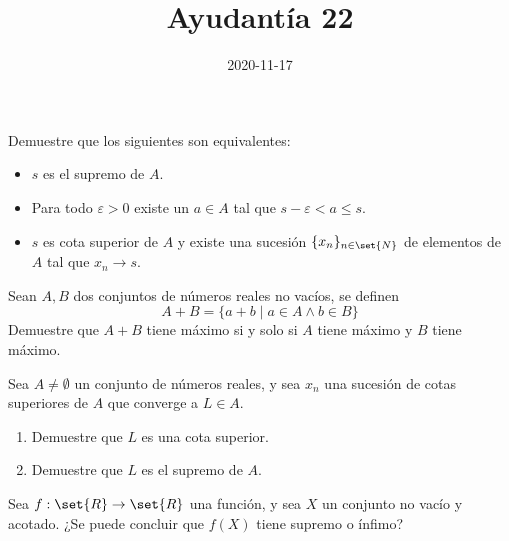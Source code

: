 \documentclass{ayudantia}
\title{Ayudantía 22}
\date{2020-11-17}
\begin{document}
\maketitle

\begin{prob}
    Demuestre que los siguientes son equivalentes:
    \begin{itemize}
        \item \(s\) es el supremo de \(A\).
        \item Para todo \(\varepsilon>0\) existe un \(a\in A\) tal que \(s-\varepsilon< a\leq s\).
        \item \(s\) es cota superior de \(A\) y existe una sucesión \(\{x_n\}_{n\in\set{N}}\) de elementos de \(A\) tal que \(x_n\rightarrow s\).
    \end{itemize}
\end{prob}

\begin{ans}
    \begin{sol}

    \end{sol}
\end{ans}



\begin{prob}
    Sean \(A,B\) dos conjuntos de números reales no vacíos, se definen
    \begin{equation*}
        A+B=\{a+b\mid a\in A\wedge b\in B\}
    \end{equation*}
    Demuestre que \(A+B\) tiene máximo si y solo si \(A\) tiene máximo y \(B\) tiene máximo.
\end{prob}

\begin{ans}
    \begin{sol}

    \end{sol}
\end{ans}



\begin{prob}
    Sea \(A\neq\emptyset\) un conjunto de números reales, y sea \(x_n\) una sucesión de cotas superiores de \(A\) que converge a \(L\in A\).
    \begin{enumerate}
        \item Demuestre que \(L\) es una cota superior.
        \item Demuestre que \(L\) es el supremo de \(A\).
    \end{enumerate}
\end{prob}

\begin{ans}
    \begin{sol}

    \end{sol}
\end{ans}



\begin{prob}
    Sea \(f:\set{R}\rightarrow\set{R}\) una función, y sea \(X\) un conjunto no vacío y acotado. ¿Se puede concluir que \(f(X)\) tiene supremo o ínfimo?
\end{prob}

\begin{ans}
    \begin{sol}

    \end{sol}
\end{ans}
\end{document}
